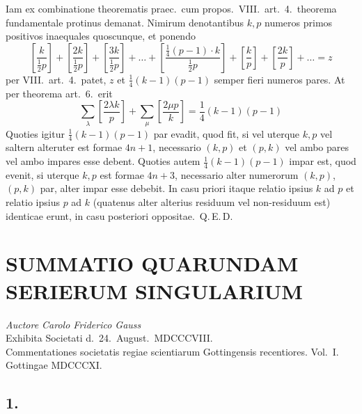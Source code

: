 \documentclass[12pt,a4paper]{article}
\theoremstyle{plain}
\begin{document}
Iam ex combinatione theorematis praec.\ cum propos.\ VIII.\ art.\ 4.\ theorema fundamentale protinus demanat. Nimirum denotantibus $k, p$ numeros primos positivos inaequales quoscunque, et ponendo
\[
\left[\frac{k}{\frac{1}{2}p}\right] + \left[\frac{2k}{\frac{1}{2}p}\right] + \left[\frac{3k}{\frac{1}{2}p}\right] + \ldots + \left[\frac{\frac{1}{4}(p-1) \cdot k}{\frac{1}{2}p}\right] + \left[\frac{k}{p}\right] + \left[\frac{2k}{p}\right] + \ldots = z
\]
per VIII.\ art.\ 4.\ patet, $z$ et $\frac{1}{4}(k-1)(p-1)$ semper fieri numeros pares. At per theorema art.\ 6.\ erit
\[
\sum_{\lambda} \left[\frac{2\lambda k}{p}\right] + \sum_{\mu} \left[\frac{2\mu p}{k}\right] = \frac{1}{4}(k-1)(p-1)
\]
Quoties igitur $\frac{1}{4}(k-1)(p-1)$ par evadit, quod fit, si vel uterque $k, p$ vel saltern alteruter est formae $4n+1$, necessario $(k, p)$ et $(p, k)$ vel ambo pares vel ambo impares esse debent. Quoties autem $\frac{1}{4}(k-1)(p-1)$ impar est, quod evenit, si uterque $k, p$ est formae $4n+3$, necessario alter numerorum $(k, p)$, $(p, k)$ par, alter impar esse debebit. In casu priori itaque relatio ipsius $k$ ad $p$ et relatio ipsius $p$ ad $k$ (quatenus alter alterius residuum vel non-residuum est) identicae erunt, in casu posteriori oppositae.\ Q.\,E.\,D.

\newpage
\section*{SUMMATIO QUARUNDAM SERIERUM SINGULARIUM}

\begin{center}
\textit{Auctore Carolo Friderico Gauss}\\
Exhibita Societati d.\ 24.\ August.\ MDCCCVIII.\\[0.5em]
\small Commentationes societatis regiae scientiarum Gottingensis recentiores. Vol.\ I.\\
Gottingae MDCCCXI.
\end{center}

\subsection*{1.}
\end{document}
